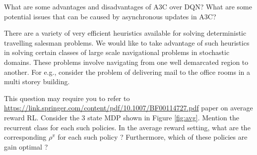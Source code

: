 \documentclass[solution,addpoints,12pt]{exam}
\begin{document}
\begin{questions}
\question[3] What are some advantages and disadvantages of A3C over DQN? What are some potential issues that can be caused by asynchronous updates in A3C?

\begin{solution}

\end{solution}

\question[6] There are a variety of very efficient heuristics available for solving deterministic travelling salesman problems. We would like to take advantage of such heuristics in solving
certain classes of large scale navigational problems in stochastic domains. These problems involve navigating from one well demarcated region to another. For e.g., consider
the problem of delivering mail to the office rooms in a multi storey building.


\question[6] This question may require you to refer to \href{this}{https://link.springer.com/content/pdf/10.1007/BF00114727.pdf} paper on average reward RL. Consider the 3 state MDP shown in Figure \ref{fig:avg}.  Mention the recurrent class for each such policies. In the average reward setting, what are the corresponding $\rho^{\pi}$ for each such policy ? Furthermore, which of these policies are gain optimal ? 


\end{questions}
\end{document}
